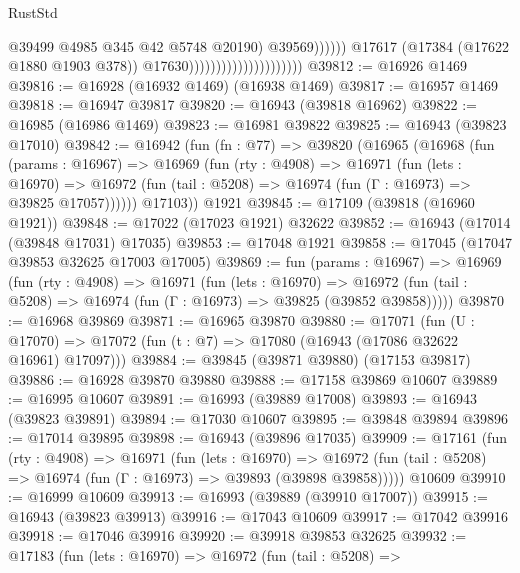 \begin{lexlean}{RustStd}
\begin{coremodule}
                                                            @39499
                                                            @4985
                                                            @345
                                                            @42
                                                            @5748
                                                            @20190)
                                                          @39569))))))
                                              @17617
                                              (@17384 (@17622 @1880 @1903 @378))
                                              @17630)))))))))))))))))))))
@39812 := @16926 @1469
@39816 := @16928 (@16932 @1469) (@16938 @1469)
@39817 := @16957 @1469
@39818 := @16947 @39817
@39820 := @16943 (@39818 @16962)
@39822 := @16985 (@16986 @1469)
@39823 := @16981 @39822
@39825 := @16943 (@39823 @17010)
@39842 := @16942
    (fun (fn : @77) =>
    @39820
      (@16965
        (@16968
          (fun (params : @16967) =>
          @16969
            (fun (rty : @4908) =>
            @16971
              (fun (lets : @16970) =>
              @16972 (fun (tail : @5208) => @16974 (fun (Γ : @16973) => @39825 @17057))))))
        @17103))
    @1921
@39845 := @17109 (@39818 (@16960 @1921))
@39848 := @17022 (@17023 @1921) @32622
@39852 := @16943 (@17014 (@39848 @17031) @17035)
@39853 := @17048 @1921
@39858 := @17045 (@17047 @39853 @32625 @17003 @17005)
@39869 := fun (params : @16967) =>
  @16969
    (fun (rty : @4908) =>
    @16971
      (fun (lets : @16970) =>
      @16972 (fun (tail : @5208) => @16974 (fun (Γ : @16973) => @39825 (@39852 @39858)))))
@39870 := @16968 @39869
@39871 := @16965 @39870
@39880 := @17071
    (fun (U : @17070) => @17072 (fun (t : @7) => @17080 (@16943 (@17086 @32622 @16961) @17097)))
@39884 := @39845 (@39871 @39880) (@17153 @39817)
@39886 := @16928 @39870 @39880
@39888 := @17158 @39869 @10607
@39889 := @16995 @10607
@39891 := @16993 (@39889 @17008)
@39893 := @16943 (@39823 @39891)
@39894 := @17030 @10607
@39895 := @39848 @39894
@39896 := @17014 @39895
@39898 := @16943 (@39896 @17035)
@39909 := @17161
    (fun (rty : @4908) =>
    @16971
      (fun (lets : @16970) =>
      @16972 (fun (tail : @5208) => @16974 (fun (Γ : @16973) => @39893 (@39898 @39858)))))
    @10609
@39910 := @16999 @10609
@39913 := @16993 (@39889 (@39910 @17007))
@39915 := @16943 (@39823 @39913)
@39916 := @17043 @10609
@39917 := @17042 @39916
@39918 := @17046 @39916
@39920 := @39918 @39853 @32625
@39932 := @17183
    (fun (lets : @16970) =>
    @16972
      (fun (tail : @5208) =>

\end{coremodule}
\end{lexlean}
